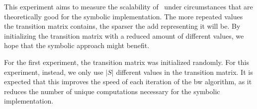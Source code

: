 This experiment aims to measure the scalability of \JajapyTwo\ under circumstances that are theoretically good for the symbolic implementation.
The more repeated values the transition matrix contains, the sparser the \gls{add} representing it will be.
By initializing the transition matrix with a reduced amount of different values, we hope that the symbolic approach might benefit.

For the first experiment, the transition matrix was initialized randomly.
For this experiment, instead, we only use $|S|$ different values in the transition matrix.
It is expected that this improves the speed of each iteration of the \gls{bw} algorithm, as it reduces the number of unique computations necessary for the symbolic implementation.
